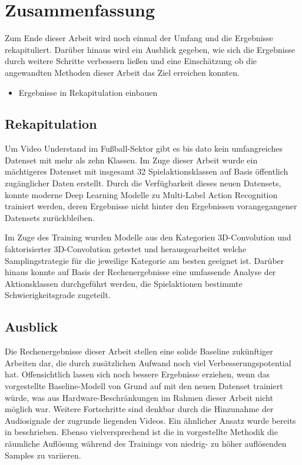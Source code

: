 \chapter{Zusammenfassung}
\label{ch:zusammenfassung}

Zum Ende dieser Arbeit wird noch einmal der Umfang und die Ergebnisse rekapituliert.
Darüber hinaus wird ein Ausblick gegeben, wie sich die Ergebnisse durch weitere Schritte verbessern ließen und eine Einschätzung ob die angewandten Methoden dieser Arbeit das Ziel erreichen konnten.

\begin{tcolorbox}[title=Todo]
 \begin{itemize}
  \item Ergebnisse in Rekapitulation einbauen
 \end{itemize}
 \end{tcolorbox}

\section{Rekapitulation}
\label{sec:rekapitulation}

Um Video Understand im Fußball-Sektor gibt es bis dato kein umfangreiches Datenset mit mehr als zehn Klassen.
Im Zuge dieser Arbeit wurde ein mächtigeres Datenset mit insgesamt 32 Spielaktionsklassen auf Basis öffentlich zugänglicher Daten erstellt.
Durch die Verfügbarkeit dieses neuen Datensets, konnte moderne Deep Learning Modelle zu Multi-Label Action Recognition trainiert werden, deren Ergebnisse nicht hinter den Ergebnissen vorangegangener Datensets zurückbleiben.

Im Zuge des Training wurden Modelle aus den Kategorien 3D-Convolution und faktorisierter 3D-Convolution getestet und herausgearbeitet welche Samplingstrategie für die jeweilige Kategorie am besten geeignet ist.
Darüber hinaus konnte auf Basis der Rechenergebnisse eine umfassende Analyse der Aktionsklassen durchgeführt werden, die Spielaktionen bestimmte Schwierigkeitsgrade zugeteilt.


\section{Ausblick}
\label{sec:ausblick}

Die Rechenergebnisse dieser Arbeit stellen eine solide Baseline zukünftiger Arbeiten dar, die durch zusätzlichen Aufwand noch viel Verbesserungspotential hat.
Offensichtlich lassen sich noch bessere Ergebnisse erziehen, wenn das vorgestellte Baseline-Modell von Grund auf mit den neuen Datenset trainiert würde, was aus Hardware-Beschränkungen im Rahmen dieser Arbeit nicht möglich war.
Weitere Fortschritte sind denkbar durch die Hinzunahme der Audiosignale der zugrunde liegenden Videos.
Ein ähnlicher Ansatz wurde bereits in \cite{Wang19} beschrieben.
Ebenso vielversprechend ist die in \cite{Wu20} vorgestellte Methodik die räumliche Auflösung während des Trainings von niedrig- zu höher auflösenden Samples zu variieren.

